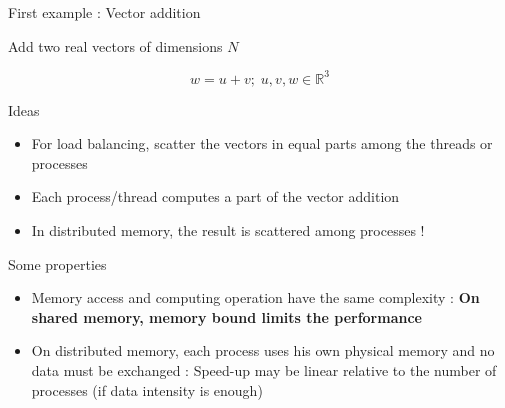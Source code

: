 \documentclass[compress,10pt,aspectratio=169]{beamer}
\begin{document}
\begin{frame}[fragile]{First example : Vector addition}
    \scriptsize
    \begin{center}\small Add two real vectors of dimensions $N$ \end{center}

    \[
        w = u + v;\; u,v,w\in\mathbb{R}^{3}
    \]

    \begin{block}{Ideas}
    \begin{itemize}
        \item For load balancing, scatter the vectors in equal parts among the threads or processes 
        \item Each process/thread computes a part of the vector addition
        \item \alert{In distributed memory, the result is scattered among processes !}
    \end{itemize}
    \end{block}

    \begin{block}{Some properties}
    \begin{itemize}
        \item Memory access and computing operation have the same complexity : 
              \textbf{On shared memory, memory bound limits the performance}
        \item On distributed memory, each process uses his own physical memory and no data must be 
              exchanged : Speed-up may be linear relative to the number of processes (if data
              intensity is enough)
    \end{itemize}
    \end{block}
\end{frame}
\end{document}
